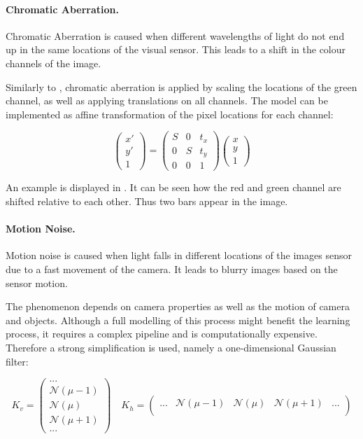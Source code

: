 \paragraph{Chromatic Aberration.}

Chromatic Aberration is caused when different wavelengths of light do not end up in the same locations of the visual sensor. This leads to a shift in the colour channels of the image.

Similarly to \cite{Carlson2018}, chromatic aberration is applied by scaling the locations of the green channel, as well as applying translations on all channels. The model can be implemented as affine transformation of the pixel locations for each channel:

\begin{equation}
\begin{pmatrix}
x' \\
y' \\
1
\end{pmatrix} = \begin{pmatrix}
S & 0 & t_x \\
0 & S & t_y \\
0 & 0 & 1
\end{pmatrix} \begin{pmatrix}
x \\
y \\
1
\end{pmatrix}
\end{equation}

An example is displayed in . It can be seen how the red and green channel are shifted relative to each other. Thus two bars appear in the image.

\paragraph{Motion Noise.}

Motion noise is caused when light falls in different locations of the images sensor due to a fast movement of the camera. It leads to blurry images based on the sensor motion.

The phenomenon depends on camera properties as well as the motion of camera and objects. Although a full modelling of this process might benefit the learning process, it requires a complex pipeline and is computationally expensive. Therefore a strong simplification is used, namely a one-dimensional Gaussian filter:

\begin{equation}
K_v = \begin{pmatrix}
...				 \\
\mathcal{N}(\mu-1) \\
\mathcal{N}(\mu)  \\
\mathcal{N}(\mu+1)	 \\
	...					
\end{pmatrix} \quad
K_h = \begin{pmatrix}
...	& \mathcal{N}(\mu-1)	&	\mathcal{N}(\mu) &	\mathcal{N}(\mu+1) & ...\\
\end{pmatrix}
	\label{eq:motion_noise}
\end{equation}

